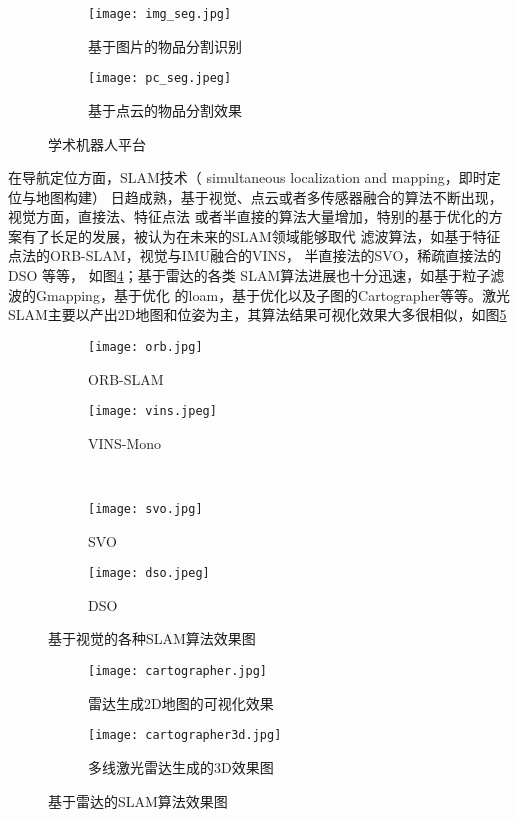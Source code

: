 \begin{figure}
\centering
\begin{subfigure}{.5\textwidth}
  \centering
  \texttt{[image: img\_seg.jpg]}
  \caption{基于图片的物品分割识别}
  \label{fig:img_seg}
\end{subfigure}%
\begin{subfigure}{.5\textwidth}
  \centering
  \texttt{[image: pc\_seg.jpeg]}
  \caption{基于点云的物品分割效果}
  \label{fig:pc_seg}
\end{subfigure}
\caption{学术机器人平台}
\end{figure}


在导航定位方面，SLAM技术（ simultaneous localization and mapping，即时定位与地图构建）
日趋成熟，基于视觉、点云或者多传感器融合的算法不断出现，视觉方面，直接法、特征点法
或者半直接的算法大量增加，特别的基于优化的方案有了长足的发展，被认为在未来的SLAM领域能够取代
滤波算法，如基于特征点法的ORB-SLAM\cite{mur2015orb}，视觉与IMU融合的VINS\cite{qin2018vins}，
半直接法的SVO\cite{forster2014svo}，稀疏直接法的DSO\cite{engel2017direct} 等等，
如图\ref{fig:slams}；基于雷达的各类
SLAM算法进展也十分迅速，如基于粒子滤波的Gmapping\cite{grisettiyz2005improving}，基于优化
的loam\cite{zhang2014loam}，基于优化以及子图的Cartographer\cite{hess2016real}等等。激光
SLAM主要以产出2D地图和位姿为主，其算法结果可视化效果大多很相似，如图\ref{fig:lidar_slams}

\begin{figure}
\centering
\begin{subfigure}{.6\textwidth}
  \centering
  \texttt{[image: orb.jpg]}
  \caption{ORB-SLAM}
\end{subfigure}%
\begin{subfigure}{.4\textwidth}
  \centering
  \texttt{[image: vins.jpeg]}
  \caption{VINS-Mono}
\end{subfigure}
\\
\begin{subfigure}{.59\textwidth}
  \centering
  \texttt{[image: svo.jpg]}
  \caption{SVO}
\end{subfigure}
\begin{subfigure}{.4\textwidth}
  \centering
  \texttt{[image: dso.jpeg]}
  \caption{DSO}
\end{subfigure}
\caption{基于视觉的各种SLAM算法效果图}
\label{fig:slams}
\end{figure}


\begin{figure}
\centering
\begin{subfigure}{.5\textwidth}
  \centering
  \texttt{[image: cartographer.jpg]}
  \caption{雷达生成2D地图的可视化效果}
\end{subfigure}%
\begin{subfigure}{.5\textwidth}
  \centering
  \texttt{[image: cartographer3d.jpg]}
  \caption{多线激光雷达生成的3D效果图}
\end{subfigure}
\caption{基于雷达的SLAM算法效果图}
\label{fig:lidar_slams}
\end{figure}


